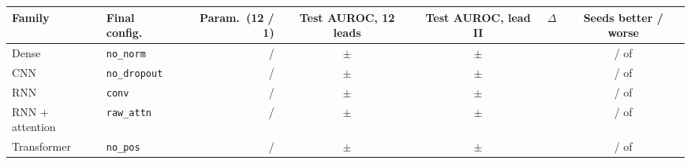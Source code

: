 \begin{tabular}{llrccrc}
\toprule
Family & Final config. & Param.\ (12 / 1) & Test AUROC, 12 leads & Test AUROC, lead II & $\Delta$ & Seeds better / worse \\
\midrule
Dense & \texttt{no\_norm} & \leadsParamsTwelveDense{} / \leadsParamsOneleadDense{} & \leadsTestAurocMeanTwelveDense{} $\pm$ \leadsTestAurocSdTwelveDense{} & \leadsTestAurocMeanOneleadDense{} $\pm$ \leadsTestAurocSdOneleadDense{} & \leadsTestDiffMeanDense{} & \leadsTestNBetterDense{} / \leadsTestNWorseDense{} of \leadsTestNComparedDense{} \\
CNN & \texttt{no\_dropout} & \leadsParamsTwelveCnn{} / \leadsParamsOneleadCnn{} & \leadsTestAurocMeanTwelveCnn{} $\pm$ \leadsTestAurocSdTwelveCnn{} & \leadsTestAurocMeanOneleadCnn{} $\pm$ \leadsTestAurocSdOneleadCnn{} & \leadsTestDiffMeanCnn{} & \leadsTestNBetterCnn{} / \leadsTestNWorseCnn{} of \leadsTestNComparedCnn{} \\
RNN & \texttt{conv} & \leadsParamsTwelveRnn{} / \leadsParamsOneleadRnn{} & \leadsTestAurocMeanTwelveRnn{} $\pm$ \leadsTestAurocSdTwelveRnn{} & \leadsTestAurocMeanOneleadRnn{} $\pm$ \leadsTestAurocSdOneleadRnn{} & \leadsTestDiffMeanRnn{} & \leadsTestNBetterRnn{} / \leadsTestNWorseRnn{} of \leadsTestNComparedRnn{} \\
RNN + attention & \texttt{raw\_attn} & \leadsParamsTwelveRnnattn{} / \leadsParamsOneleadRnnattn{} & \leadsTestAurocMeanTwelveRnnattn{} $\pm$ \leadsTestAurocSdTwelveRnnattn{} & \leadsTestAurocMeanOneleadRnnattn{} $\pm$ \leadsTestAurocSdOneleadRnnattn{} & \leadsTestDiffMeanRnnattn{} & \leadsTestNBetterRnnattn{} / \leadsTestNWorseRnnattn{} of \leadsTestNComparedRnnattn{} \\
Transformer & \texttt{no\_pos} & \leadsParamsTwelveTransformer{} / \leadsParamsOneleadTransformer{} & \leadsTestAurocMeanTwelveTransformer{} $\pm$ \leadsTestAurocSdTwelveTransformer{} & \leadsTestAurocMeanOneleadTransformer{} $\pm$ \leadsTestAurocSdOneleadTransformer{} & \leadsTestDiffMeanTransformer{} & \leadsTestNBetterTransformer{} / \leadsTestNWorseTransformer{} of \leadsTestNComparedTransformer{} \\
\bottomrule
\end{tabular}
